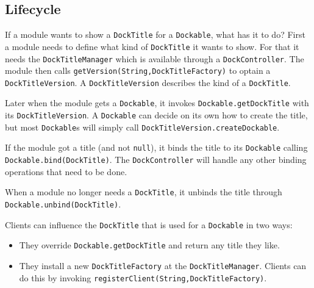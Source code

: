 \documentclass[a4paper,10pt]{article}
\newcommand{\src}[1]{\lstinline[basicstyle=\normalsize\ttfamily,keywordstyle=\normalsize\ttfamily,identifierstyle=\normalsize\ttfamily]|#1|}
\begin{document}
\subsection{Lifecycle}
If a module wants to show a \src{DockTitle} for a \src{Dockable}, what has it to do? First a module needs to define what kind of \src{DockTitle} it wants to show. For that it needs the \src{DockTitleManager} which is available through a \src{DockController}. The module then calls \src{getVersion(String,DockTitleFactory)} to optain a \src{DockTitleVersion}. A \src{DockTitleVersion} describes the kind of a \src{DockTitle}.

Later when the module gets a \src{Dockable}, it invokes \src{Dockable.getDockTitle} with its \src{DockTitleVersion}. A \src{Dockable} can decide on its own how to create the title, but most \src{Dockable}s will simply call \src{DockTitleVersion.createDockable}.

If the module got a title (and not \src{null}), it binds the title to its \src{Dockable} calling \src{Dockable.bind(DockTitle)}. The \src{DockController} will handle any other binding operations that need to be done.

When a module no longer needs a \src{DockTitle}, it unbinds the title through \src{Dockable.unbind(DockTitle)}.

Clients can influence the \src{DockTitle} that is used for a \src{Dockable} in two ways:
\begin{itemize}
 \item They override \src{Dockable.getDockTitle} and return any title they like.
 \item They install a new \src{DockTitleFactory} at the \src{DockTitleManager}. Clients can do this by invoking \src{registerClient(String,DockTitleFactory)}.
\end{itemize}
\end{document}

